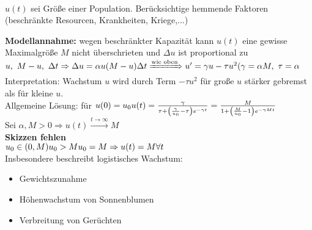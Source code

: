 \begin{beispiel}
\mbox{}\\
$u(t) $ sei Größe einer Population.
Berücksichtige hemmende Faktoren (beschränkte Resourcen, Krankheiten, Kriege,...)

\textbf{Modellannahme:} wegen beschränkter Kapazität kann $u(t) $
eine gewisse Maximalgröße $M$ nicht überschrieten und
$\Delta u $ ist proportional zu $u, \ M-u, \ \Delta t \\
\Rightarrow \Delta u = \alpha u(M-u) \Delta t 
\xRightarrow{\text{wie oben}} 
u' = \gamma u - \tau u^2 (\gamma = \alpha M, \ \tau = \alpha $\\
Interpretation: Wachstum $u$ wird durch Term $-\tau u^2 $ für große $u$ stärker gebremst als für kleine $u$. \\

Allgemeine Lösung: für $u(0) = u_0 \\
u(t) = \frac{\gamma}{\tau + \left(\frac{\gamma}{u_0} - \tau \right) e^{-\gamma t}}
= \frac{M}{1+\left(\frac{M}{u_0} - 1 \right) e^{-\gamma M t}} $ \\
Sei  $\alpha, M > 0 \Rightarrow u(t) \xrightarrow{t\rightarrow\infty} M $\\
\textbf{Skizzen fehlen}\\
$u_0 \in (0,M)\\
u_0 >M\\
u_0 = M \Rightarrow u(t) = M \forall t $\\

Insbesondere beschreibt logistisches Wachstum:
\begin{itemize}
    \item Gewichtszunahme
    \item Höhenwachstum von Sonnenblumen
    \item Verbreitung von Gerüchten
\end{itemize}

\end{beispiel}

